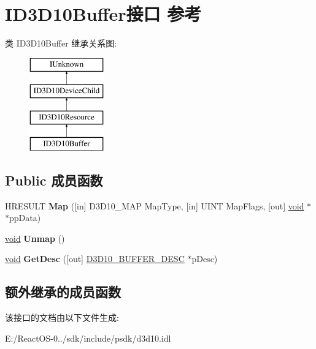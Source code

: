 \hypertarget{interface_i_d3_d10_buffer}{}\section{I\+D3\+D10\+Buffer接口 参考}
\label{interface_i_d3_d10_buffer}
类 I\+D3\+D10\+Buffer 继承关系图\+:\begin{figure}[H]
\begin{center}
\leavevmode
\includegraphics[height=4.000000cm]{interface_i_d3_d10_buffer}
\end{center}
\end{figure}
\subsection*{Public 成员函数}
\begin{DoxyCompactItemize}
\item 
\mbox{\label{interface_i_d3_d10_buffer_a42450221faa531590e94a177a645480c}} 
H\+R\+E\+S\+U\+LT {\bfseries Map} (\mbox{[}in\mbox{]} D3\+D10\+\_\+\+M\+AP Map\+Type, \mbox{[}in\mbox{]} U\+I\+NT Map\+Flags, \mbox{[}out\mbox{]} \hyperlink{interfacevoid}{void} $\ast$$\ast$pp\+Data)
\item 
\mbox{\label{interface_i_d3_d10_buffer_ac73d4b21981274dacad3c1c8361cd94f}} 
\hyperlink{interfacevoid}{void} {\bfseries Unmap} ()
\item 
\mbox{\label{interface_i_d3_d10_buffer_aed9c0d760ed057b3af785619b7aa0af4}} 
\hyperlink{interfacevoid}{void} {\bfseries Get\+Desc} (\mbox{[}out\mbox{]} \hyperlink{struct_d3_d10___b_u_f_f_e_r___d_e_s_c}{D3\+D10\+\_\+\+B\+U\+F\+F\+E\+R\+\_\+\+D\+E\+SC} $\ast$p\+Desc)
\end{DoxyCompactItemize}
\subsection*{额外继承的成员函数}


该接口的文档由以下文件生成\+:\begin{DoxyCompactItemize}
\item 
E\+:/\+React\+O\+S-\/0../sdk/include/psdk/d3d10.\+idl\end{DoxyCompactItemize}

